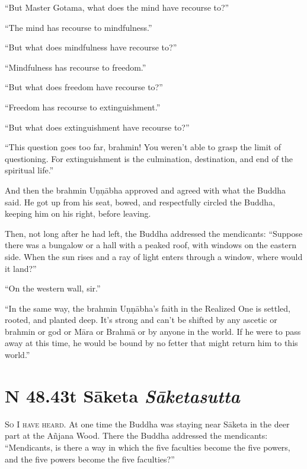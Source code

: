 \documentclass[12pt,openany]{book}%
\newcommand*{\suttatitleacronym}[1]{\smaller[2]{#1}\vspace*{.3em}}
\newcommand*{\suttatitletranslation}[1]{\linebreak{#1}}
\newcommand*{\suttatitleroot}[1]{\linebreak\smaller[2]\itshape{#1}}
\newcommand*{\tocacronym}[1]{\hspace*{-3.3em}{#1}\quad}
\newcommand*{\toctranslation}[1]{#1}
\newcommand*{\tocroot}[1]{(\textit{#1})}
\newcommand*{\scevam}[1]{\textsc{#1}}
\begin{document}
“But Master Gotama, what does the mind have recourse to?” 

“The mind has recourse to mindfulness.” 

“But what does mindfulness have recourse to?” 

“Mindfulness has recourse to freedom.” 

“But what does freedom have recourse to?” 

“Freedom has recourse to extinguishment.” 

“But what does extinguishment have recourse to?” 

“This question goes too far, brahmin! You weren’t able to grasp the limit of questioning. For extinguishment is the culmination, destination, and end of the spiritual life.” 

And then the brahmin \textsanskrit{Uṇṇābha} approved and agreed with what the Buddha said. He got up from his seat, bowed, and respectfully circled the Buddha, keeping him on his right, before leaving. 

Then, not long after he had left, the Buddha addressed the mendicants: “Suppose there was a bungalow or a hall with a peaked roof, with windows on the eastern side. When the sun rises and a ray of light enters through a window, where would it land?” 

“On the western wall, sir.” 

“In the same way, the brahmin \textsanskrit{Uṇṇābha}’s faith in the Realized One is settled, rooted, and planted deep. It’s strong and can’t be shifted by any ascetic or brahmin or god or \textsanskrit{Māra} or \textsanskrit{Brahmā} or by anyone in the world. If he were to pass away at this time, he would be bound by no fetter that might return him to this world.” 

%
\section*{{\suttatitleacronym SN 48.43}{\suttatitletranslation At Sāketa }{\suttatitleroot Sāketasutta}}
\addcontentsline{toc}{section}{\tocacronym{SN 48.43} \toctranslation{At Sāketa } \tocroot{Sāketasutta}}

\scevam{So I have heard. }At one time the Buddha was staying near \textsanskrit{Sāketa} in the deer part at the \textsanskrit{Añjana} Wood. There the Buddha addressed the mendicants: “Mendicants, is there a way in which the five faculties become the five powers, and the five powers become the five faculties?” 
\end{document}

